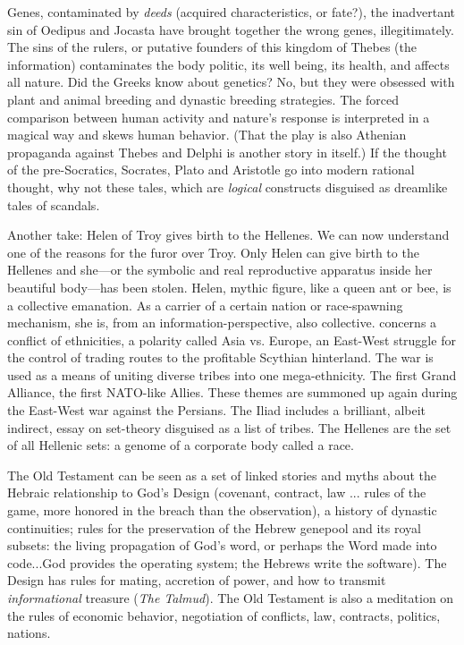 \documentclass[11pt,twoside,draft]{memoir}
\begin{document}
Genes, contaminated by \emph{deeds} (acquired
characteristics, or fate?), the inadvertant sin
of Oedipus and Jocasta have brought together
the wrong genes, illegitimately. The sins of
the rulers, or putative founders of this kingdom of Thebes (the information) contaminates the body politic, its well being, its
health, and affects all nature. Did the Greeks
know about genetics? No, but they were
obsessed with plant and animal breeding
and dynastic breeding strategies. The forced
comparison between human activity and
nature's response is interpreted in a magical
way and skews human behavior. (That the
play is also Athenian propaganda against
Thebes and Delphi is another story in itself.)
If the thought of the pre-Socratics, Socrates,
Plato and Aristotle go into modern rational
thought, why not these tales, which are
\emph{logical} constructs disguised as dreamlike
tales of scandals.

Another take: Helen of Troy gives birth to
the Hellenes. We can now understand one of
the reasons for the furor over Troy. Only
Helen can give birth to the Hellenes and
she---or the symbolic and real reproductive
apparatus inside her beautiful body---has
been stolen. Helen, mythic figure, like a
queen ant or bee, is a collective emanation.
As a carrier of a certain nation or race-spawning mechanism,
she is, from an information-perspective, also collective.  concerns a conflict of ethnicities, a
polarity called Asia vs. Europe, an East-West
struggle for the control of trading routes to
the profitable Scythian hinterland. The war
is used as a means of uniting diverse tribes
into one mega-ethnicity. The first Grand
Alliance, the first NATO-like Allies. These
themes are summoned up again during the
East-West war against the Persians. The Iliad
includes a brilliant, albeit indirect, essay on
set-theory disguised as a list of tribes. The
Hellenes are the set of all Hellenic sets: a
genome of a corporate body called a race.

The Old Testament can be seen as a set of
linked stories and myths about the Hebraic
relationship to God's Design (covenant, contract, law ... rules of the game, more honored in the breach than the observation), a
history of dynastic continuities; rules for the
preservation of the Hebrew genepool and its
royal subsets: the living propagation of
God's word, or perhaps the Word made into
code...God provides the operating system;
the Hebrews write the software). The Design
has rules for mating, accretion of power, and
how to transmit \emph{informational} treasure (\emph{The
Talmud}). The Old Testament is also a meditation on the rules of economic behavior,
negotiation of conflicts, law, contracts, politics, nations.
\end{document}
